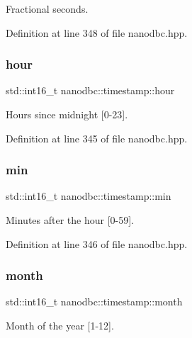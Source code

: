 Fractional seconds. 



Definition at line 348 of file nanodbc.\+hpp.

\mbox{\label{structnanodbc_1_1timestamp_a07789e9f5f634491786cf8d6ceb4e4a3}} 
\subsubsection{\texorpdfstring{hour}{hour}}
{\footnotesize\ttfamily std\+::int16\+\_\+t nanodbc\+::timestamp\+::hour}



Hours since midnight \mbox{[}0-\/23\mbox{]}. 



Definition at line 345 of file nanodbc.\+hpp.

\mbox{\label{structnanodbc_1_1timestamp_a6d43619ba944b287e1db1c41493ba2a3}} 
\subsubsection{\texorpdfstring{min}{min}}
{\footnotesize\ttfamily std\+::int16\+\_\+t nanodbc\+::timestamp\+::min}



Minutes after the hour \mbox{[}0-\/59\mbox{]}. 



Definition at line 346 of file nanodbc.\+hpp.

\mbox{\label{structnanodbc_1_1timestamp_ae2bd4cf92b2a27aac722cf431406f4e0}} 
\subsubsection{\texorpdfstring{month}{month}}
{\footnotesize\ttfamily std\+::int16\+\_\+t nanodbc\+::timestamp\+::month}



Month of the year \mbox{[}1-\/12\mbox{]}. 



